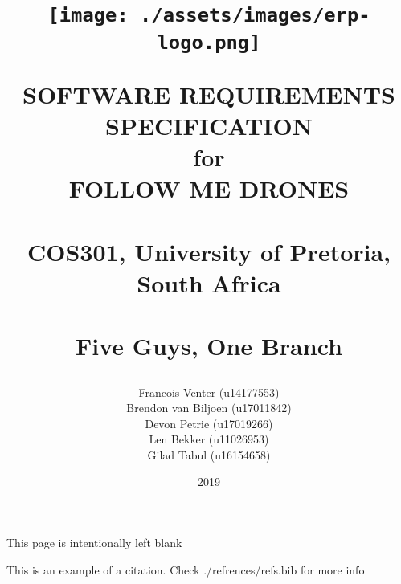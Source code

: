 \documentclass[a4paper,11pt]{book}
\title{
	\begin{figure}[h!]
		\centering
		\texttt{[image: ./assets/images/erp-logo.png]}
		\label{fig: erp-logo}
		\caption{}
	\end{figure}
	\vspace{0.5cm}
	\begin{center}
		\Huge{SOFTWARE REQUIREMENTS\\ SPECIFICATION}\\
		for\\
		FOLLOW ME DRONES\\
		~\\
		\LARGE{COS301, University of Pretoria, South Africa}\\
		~\\
		Five Guys, One Branch
	\end{center}
}
\author{
	Francois Venter (u14177553)\\ 
	Brendon van Biljoen (u17011842)\\ 
	Devon Petrie (u17019266)\\ 
	Len Bekker (u11026953)\\ 
	Gilad Tabul (u16154658)\\
}
\date{2019}
\begin{document}
\frontmatter
\maketitle

\begin{center}
	This page is intentionally left blank
\end{center}
\let\cleardoublepage\clearpage
\tableofcontents



\mainmatter

%







This is an example of a citation. \cite{DUMMY:1} Check ./refrences/refs.bib for more info 


\end{document}
